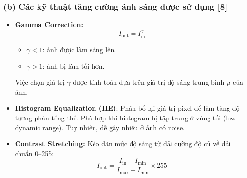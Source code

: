 \subsubsection*{(b) Các kỹ thuật tăng cường ánh sáng được sử dụng [8]}
\begin{itemize}[]
    \item \textbf{Gamma Correction:}
    \[ I_{\text{out}} = I_{\text{in}}^{\gamma} \]
    \begin{itemize}[]
        \item $\gamma < 1$: ảnh được làm sáng lên.
        \item $\gamma > 1$: ảnh bị làm tối hơn.
    \end{itemize}
    Việc chọn giá trị $\gamma$ được tính toán dựa trên giá trị độ sáng trung bình $\mu$ của ảnh.

    \item \textbf{Histogram Equalization (HE)}:
    Phân bố lại giá trị pixel để làm tăng độ tương phản tổng thể. Phù hợp khi histogram bị tập trung ở vùng tối (low dynamic range). Tuy nhiên, dễ gây nhiễu ở ảnh có noise.

    \item \textbf{Contrast Stretching:}
    Kéo dãn mức độ sáng từ dải cường độ cũ về dải chuẩn 0--255:
    \[ I_{\text{out}} = \frac{I_{\text{in}} - I_{\min}}{I_{\max} - I_{\min}} \times 255 \]
    


\end{itemize}

